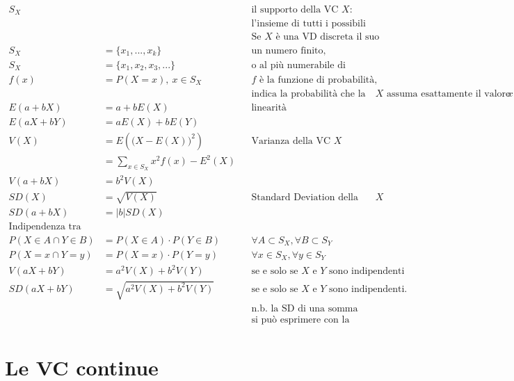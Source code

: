 \documentclass[
  11pt,
]{book}
\theoremstyle{mytheoremstyle}
\theoremstyle{mydefstyle}
\begin{document}
\begin{info2}

\begin{align*}
 S_X& & & \text{il supporto della VC $X$:} \\ 
 & & & \text{l'insieme di tutti i possibili valori che la VC può assumere. } \\ 
  &      & & \text{Se $X$ è una VD discreta il suo supporto ha:} \\ 
S_X&=\{x_1,...,x_k\} & & \text{un numero finito, } \\ 
S_X&=\{x_1,x_2,x_3,...\} & &  \text{o al più numerabile di elementi.} \\ 
 f(x)&=P(X=x),~x\in S_X & & \text{$f$ è la funzione di probabilità,} \\ 
 & & & \text{indica la probabilità che la VC $X$ assuma esattamente il valore $x$.} \\ 
E(a+bX)&=a+bE(X) & & \text{linearità} \\ 
 E(aX+bY)&=aE(X)+bE(Y) & &  \\ 
 V(X)&=E\left(\big(X-E(X)\big)^2\right) & & \text{Varianza della VC $X$} \\ 
&=\sum_{x\in S_X}x^2f(x)-E^2(X)  & &  \\ 
V(a+bX)&=b^2V(X) & &  \\ 
SD(X)&=\sqrt{V(X)} & & \text{Standard Deviation della VC $X$} \\ 
SD(a+bX)&=|b| SD(X) & &  \\ 
\text{Indipendenza tra VC}& & &  \\ 
P(X\in A\cap Y\in B)&=P(X\in A)\cdot P(Y\in B) & & \forall A \subset S_X,\forall B \subset S_Y \\ 
P(X=x\cap Y=y)&=P(X=x)\cdot P(Y=y) & & \forall x \in S_X,\forall y \in S_Y \\ 
V(aX+bY)&=a^2V(X)+b^2V(Y) & & \text{se e solo se $X$ e $Y$ sono indipendenti} \\ 
SD(aX+bY)&=\sqrt{a^2V(X)+b^2V(Y)} & & \text{se e solo se $X$ e $Y$ sono indipendenti. } \\ 
& & & \text{n.b. la SD di una somma non  } \\ 
& & & \text{si può esprimere con la somma delle SD.}  
\end{align*}

\end{info2}

\normalsize

\section{Le VC continue}\label{le-vc-continue}
\end{document}
